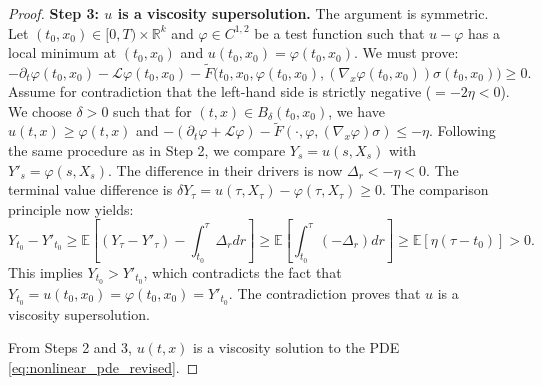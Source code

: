 \documentclass[12pt, letterpaper]{amsart}
\newcommand{\R}{\mathbb{R}}
\theoremstyle{plain}
\theoremstyle{definition}
\theoremstyle{remark}
\numberwithin{equation}{section} %
\begin{document}
\begin{proof}
\vspace{1ex}
\noindent\textbf{Step 3: $u$ is a viscosity supersolution.}
The argument is symmetric. Let $(t_0, x_0) \in [0,T) \times \R^k$ and $\varphi \in C^{1,2}$ be a test function such that $u - \varphi$ has a local minimum at $(t_0, x_0)$ and $u(t_0,x_0) = \varphi(t_0,x_0)$. We must prove:
\begin{equation} \label{eq:supersolution_ineq}
    -\partial_t \varphi(t_0,x_0) - \mathcal{L}\varphi(t_0,x_0) - \tilde{F}\big(t_0, x_0, \varphi(t_0,x_0), (\nabla_x \varphi(t_0,x_0))\sigma(t_0,x_0)\big) \ge 0.
\end{equation}
Assume for contradiction that the left-hand side is strictly negative ($= -2\eta < 0$). We choose $\delta > 0$ such that for $(t,x) \in B_\delta(t_0,x_0)$, we have $u(t,x) \ge \varphi(t,x)$ and $-(\partial_t\varphi+\mathcal{L}\varphi) - \tilde{F}(\cdot, \varphi, (\nabla_x\varphi)\sigma) \le -\eta$.
Following the same procedure as in Step 2, we compare $Y_s = u(s,X_s)$ with $Y'_s = \varphi(s,X_s)$. The difference in their drivers is now $\Delta_r < -\eta < 0$. The terminal value difference is $\delta Y_\tau = u(\tau, X_\tau) - \varphi(\tau, X_\tau) \ge 0$.
The comparison principle now yields:
\[ Y_{t_0} - Y'_{t_0} \ge \mathbb{E}\left[ (Y_\tau - Y'_\tau) - \int_{t_0}^\tau \Delta_r dr \right] \ge \mathbb{E}\left[ \int_{t_0}^\tau (-\Delta_r) dr \right] \ge \mathbb{E}[\eta(\tau-t_0)] > 0. \]
This implies $Y_{t_0} > Y'_{t_0}$, which contradicts the fact that $Y_{t_0} = u(t_0,x_0) = \varphi(t_0,x_0) = Y'_{t_0}$. The contradiction proves that $u$ is a viscosity supersolution.

From Steps 2 and 3, $u(t,x)$ is a viscosity solution to the PDE \eqref{eq:nonlinear_pde_revised}.


\end{proof}
\end{document}
